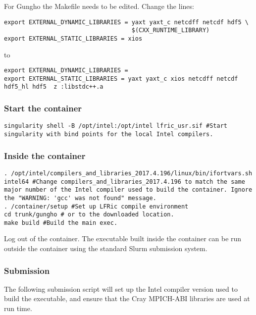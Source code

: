 \documentclass[12pt]{article}
\begin{document}
For Gungho the Makefile needs to be edited. Change the lines:

\begin{lstlisting}[breaklines]
export EXTERNAL_DYNAMIC_LIBRARIES = yaxt yaxt_c netcdff netcdf hdf5 \
                                    $(CXX_RUNTIME_LIBRARY)
export EXTERNAL_STATIC_LIBRARIES = xios
\end{lstlisting}

to

\begin{lstlisting}[breaklines]
export EXTERNAL_DYNAMIC_LIBRARIES = 
export EXTERNAL_STATIC_LIBRARIES = yaxt yaxt_c xios netcdff netcdf hdf5_hl hdf5  z :libstdc++.a
\end{lstlisting}

\subsubsection*{Start the container}

\begin{lstlisting}[breaklines]
singularity shell -B /opt/intel:/opt/intel lfric_usr.sif #Start singularity with bind points for the local Intel compilers.
\end{lstlisting}

\subsubsection*{Inside the container}

\begin{lstlisting}[breaklines]
. /opt/intel/compilers_and_libraries_2017.4.196/linux/bin/ifortvars.sh intel64 #Change compilers_and_libraries_2017.4.196 to match the same major number of the Intel compiler used to build the container. Ignore the "WARNING: 'gcc' was not found" message.
. /container/setup #Set up LFRic compile environment
cd trunk/gungho # or to the downloaded location.
make build #Build the main exec.
\end{lstlisting}

Log out of the container. The executable built inside the container can be run
outside the container using the standard Slurm submission system.

\subsubsection*{Submission}

The following submission script will set up the Intel compiler version used
to build the executable, and ensure that the Cray MPICH-ABI libraries are
used at run time.
\end{document}
